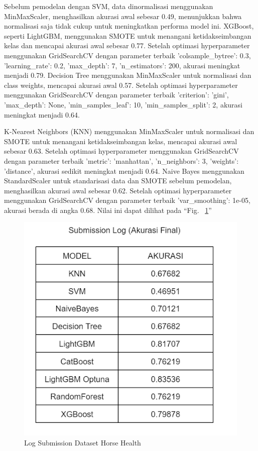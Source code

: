 \documentclass[conference]{IEEEtran}
\begin{document}
Sebelum pemodelan dengan SVM, data dinormalisasi menggunakan MinMaxScaler, menghasilkan akurasi awal sebesar 0.49, menunjukkan bahwa normalisasi saja tidak cukup untuk meningkatkan performa model ini. XGBoost, seperti LightGBM, menggunakan SMOTE untuk menangani 
ketidakseimbangan kelas dan mencapai akurasi awal sebesar 0.77. Setelah optimasi hyperparameter menggunakan GridSearchCV dengan parameter terbaik {'colsample\_bytree': 0.3, 'learning\_rate': 0.2, 'max\_depth': 7, 'n\_estimators': 200}, akurasi meningkat menjadi 0.79. 
Decision Tree menggunakan MinMaxScaler untuk normalisasi dan class weights, mencapai akurasi awal 0.57. Setelah optimasi hyperparameter menggunakan GridSearchCV dengan parameter terbaik {'criterion': 'gini', 'max\_depth': None, 'min\_samples\_leaf': 10, 'min\_samples\_split': 2}, 
akurasi meningkat menjadi 0.64.

K-Nearest Neighbors (KNN) menggunakan MinMaxScaler untuk normalisasi dan SMOTE untuk menangani ketidakseimbangan kelas, mencapai akurasi awal sebesar 0.63. Setelah optimasi hyperparameter menggunakan GridSearchCV dengan parameter terbaik 
{'metric': 'manhattan', 'n\_neighbors': 3, 'weights': 'distance'}, akurasi sedikit meningkat menjadi 0.64. Naive Bayes menggunakan StandardScaler untuk standarisasi data dan SMOTE sebelum pemodelan, 
menghasilkan akurasi awal sebesar 0.62. Setelah optimasi hyperparameter menggunakan GridSearchCV dengan parameter terbaik {'var\_smoothing': 1e-05}, akurasi berada di angka 0.68. Nilai ini dapat dilihat pada ``Fig. ~\ref{horse_log}''

\begin{figure}[htbp]
    \centerline{\includegraphics[scale=0.4]{horse_log.png}}
    \caption{Log Submission Dataset Horse Health}
    \label{horse_log}
\end{figure}
\end{document}
